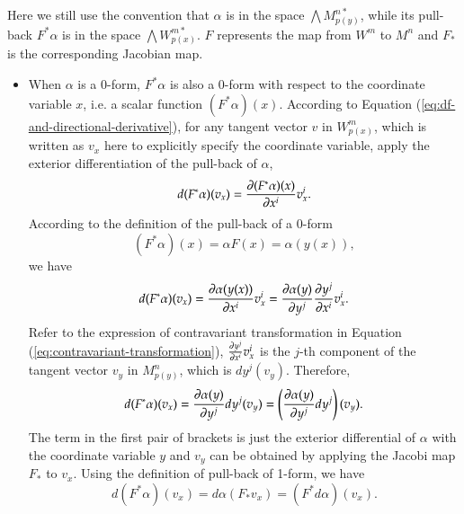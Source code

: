 \documentclass[11pt, a4paper]{book}
\begin{document}
\begin{enumerate}
  \begin{Proof}
    Here we still use the convention that $\alpha$ is in the space
    $\bigwedge M_{p(y)}^{n*}$, while its pull-back $F^{*}\alpha$ is in the space
    $\bigwedge W_{p(x)}^{m*}$. $F$ represents the map from $W^m$ to $M^n$ and $F_{*}$ is the
    corresponding Jacobian map.
    \begin{itemize}
    \item When $\alpha$ is a 0-form, $F^{*}\alpha$ is also a 0-form with respect to the
      coordinate variable $x$, i.e. a scalar function $(F^{*}\alpha)(x)$. According to
      Equation (\ref{eq:df-and-directional-derivative}), for any tangent vector $v$ in
      $W_{p(x)}^m$, which is written as $v_x$ here to explicitly specify the coordinate
      variable, apply the exterior differentiation of the pull-back of $\alpha$,
      \begin{equation*}
        d(F^{*}\alpha)(v_x) = \frac{\partial (F^{*}\alpha)(x)}{\partial x^i} v_x^i.
      \end{equation*}
      According to the definition of the pull-back of a 0-form
      \begin{equation*}
        (F^{*}\alpha)(x) = \alpha F(x) = \alpha(y(x)),
      \end{equation*}
      we have
      \begin{equation*}
        d(F^{*}\alpha)(v_x) = \frac{\partial \alpha(y(x))}{\partial x^i} v_x^i = \frac{\partial
          \alpha(y)}{\partial y^j} \frac{\partial y^j}{\partial x^i} v_x^i.
      \end{equation*}
      Refer to the expression of contravariant transformation in Equation
      (\ref{eq:contravariant-transformation}), $\frac{\partial y^j}{\partial x^i}v_x^i$ is the
      $j$-th component of the tangent vector $v_y$ in $M_{p(y)}^n$, which is $dy^j(v_y)$.
      Therefore,
      \begin{equation*}
        d(F^{*}\alpha)(v_x) = \frac{\partial \alpha(y)}{\partial y^j} dy^j(v_y) = \left(
          \frac{\partial \alpha(y)}{\partial y^j} dy^j \right)(v_y).
      \end{equation*}
      The term in the first pair of brackets is just the exterior differential of $\alpha$
      with the coordinate variable $y$ and $v_y$ can be obtained by applying the Jacobi
      map $F_*$ to $v_x$. Using the definition of pull-back of 1-form, we have
      \begin{equation*}
        d(F^{*}\alpha)(v_x) = d\alpha(F_{*}v_x) = (F^{*} d\alpha)(v_x).
      \end{equation*}

\end{itemize}
\end{Proof}
\end{enumerate}
\end{document}
